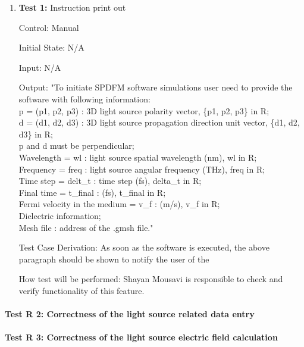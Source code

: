 \documentclass[12pt, titlepage]{article}
\begin{document}
\begin{enumerate}
	
	\item{\textbf{Test 1:} Instruction print out\\}
	
	Control: Manual
	
	Initial State: N/A
	
	Input: N/A
	
	Output: 
	"To initiate SPDFM software simulations user need to provide the software with following information:\\
	p = (p1, p2, p3) : 3D light source polarity vector, \{p1, p2, p3\} in R;\\
	d = (d1, d2, d3) : 3D light source propagation direction unit vector, \{d1, d2, d3\} in R;\\
	p and d must be perpendicular;\\ 
	Wavelength = wl : light source spatial wavelength (nm), wl in R;\\
	Frequency = freq : light source angular frequency (THz), freq in R;\\
	Time step = delt\_t : time step (fs), delta\_t in R;\\
	Final time = t\_final : (fs), t\_final in R;\\
	Fermi velocity in the medium = v\_f : (m/s), v\_f in R;\\
	Dielectric information;\\
	Mesh file : address of the .gmsh file."
	
	Test Case Derivation: As soon as the software is executed, the above paragraph should be shown to notify the user of the 
	
	How test will be performed: Shayan Mousavi is responsible to check and verify functionality of this feature.   
	
	
\end{enumerate}

\paragraph{Test R 2: Correctness of the light source related data entry}

\paragraph{Test R 3: Correctness of the light source electric field calculation}
\end{document}
